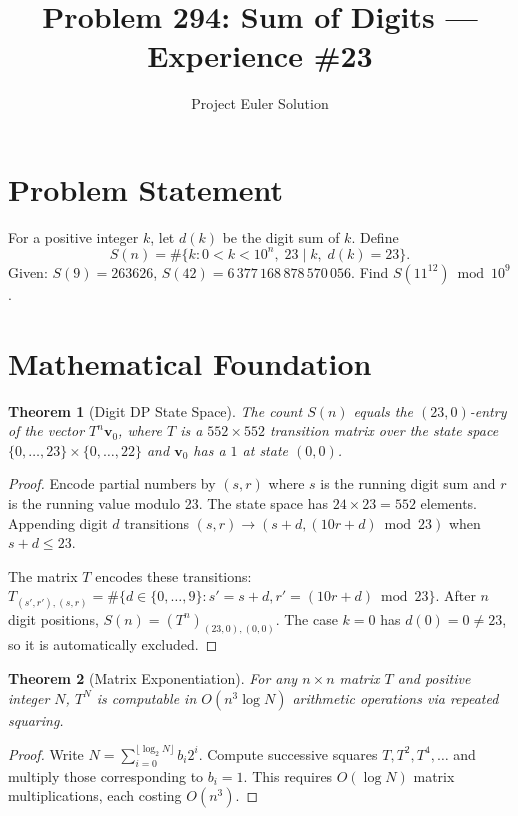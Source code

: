 \documentclass[12pt]{article}
\title{Problem 294: Sum of Digits --- Experience \#23}
\author{Project Euler Solution}
\date{}
\newtheorem{theorem}{Theorem}
\begin{document}
\maketitle

\section{Problem Statement}
For a positive integer $k$, let $d(k)$ be the digit sum of $k$. Define
\[
S(n) = \#\{k : 0 < k < 10^n,\; 23 \mid k,\; d(k) = 23\}.
\]
Given: $S(9) = 263626$, $S(42) = 6\,377\,168\,878\,570\,056$. Find $S(11^{12}) \bmod 10^9$.

\section{Mathematical Foundation}

\begin{theorem}[Digit DP State Space]
The count $S(n)$ equals the $(23, 0)$-entry of the vector $T^n \mathbf{v}_0$, where $T$ is a $552 \times 552$ transition matrix over the state space $\{0,\ldots,23\} \times \{0,\ldots,22\}$ and $\mathbf{v}_0$ has a $1$ at state $(0,0)$.
\end{theorem}

\begin{proof}
Encode partial numbers by $(s, r)$ where $s$ is the running digit sum and $r$ is the running value modulo 23. The state space has $24 \times 23 = 552$ elements. Appending digit $d$ transitions $(s, r) \to (s+d, (10r+d) \bmod 23)$ when $s + d \leq 23$.

The matrix $T$ encodes these transitions: $T_{(s',r'),(s,r)} = \#\{d \in \{0,\ldots,9\} : s' = s+d, r' = (10r+d) \bmod 23\}$. After $n$ digit positions, $S(n) = (T^n)_{(23,0),(0,0)}$. The case $k = 0$ has $d(0) = 0 \neq 23$, so it is automatically excluded.
\end{proof}

\begin{theorem}[Matrix Exponentiation]
For any $n \times n$ matrix $T$ and positive integer $N$, $T^N$ is computable in $O(n^3 \log N)$ arithmetic operations via repeated squaring.
\end{theorem}

\begin{proof}
Write $N = \sum_{i=0}^{\lfloor \log_2 N \rfloor} b_i 2^i$. Compute successive squares $T, T^2, T^4, \ldots$ and multiply those corresponding to $b_i = 1$. This requires $O(\log N)$ matrix multiplications, each costing $O(n^3)$.
\end{proof}
\end{document}
